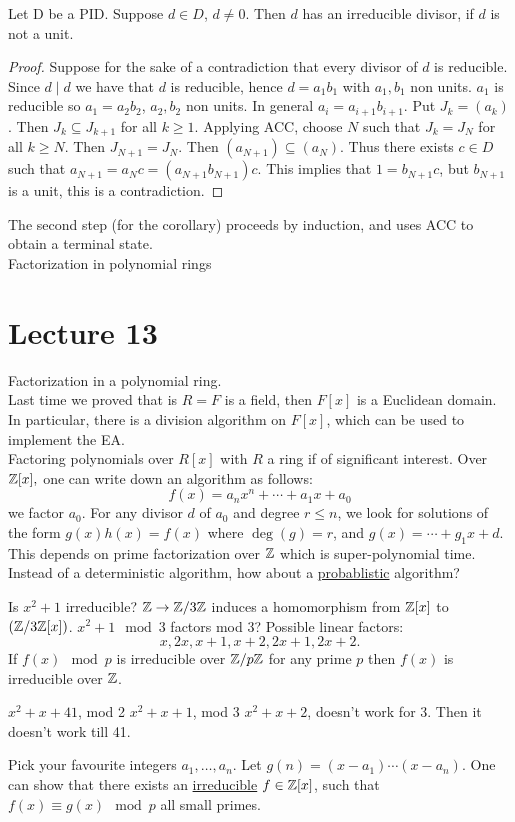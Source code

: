 \documentclass[twoside, openright, fontsize=10pt, headings=big]{scrbook}
\begin{document}
\begin{lemma}{}{}
    Let D be a PID. Suppose $d\in D$, $d\neq0$. Then $d$ has an irreducible divisor, if $d$ is not a unit.
\end{lemma}
\begin{proof}
    Suppose for the sake of a contradiction that every divisor of $d$ is reducible. Since $d\mid d$ we have that $d$ is reducible, hence $d=a_1b_1$ with $a_1,b_1$ non units. $a_1$ is reducible so $a_1=a_2b_2$, $a_2,b_2$ non units. In general $a_i=a_{i+1}b_{i+1}$. Put $J_k=(a_k)$. Then $J_k\subseteq J_{k+1}$ for all $k\geq 1$. Applying ACC, choose $N$ such that $J_k=J_N$ for all $k\geq N$. Then $J_{N+1}=J_N$. Then $(a_{N+1})\subseteq (a_N)$. Thus there exists $c\in D$ such that  $a_{N+1}=a_Nc=(a_{N+1}b_{N+1})c$. This implies that $1=b_{N+1}c$, but $b_{N+1}$ is a unit, this is a contradiction.
\end{proof}
The second step (for the corollary) proceeds by induction, and uses ACC to obtain a terminal state.\\
Factorization in polynomial rings

\chapter{Lecture 13}
Factorization in a polynomial ring.\\
Last time we proved that is $R=F$ is a field, then $F[x]$ is a Euclidean domain. In particular, there is a division algorithm on $F[x]$, which can be used to implement the EA. \\
Factoring polynomials over $R[x]$ with $R$ a ring if of significant interest. Over $\mathbb{Z}[x],$ one can write down an algorithm as follows:
\[
    f(x)=a_nx^n+\cdots+a_1x+a_0
\]
we factor $a_0$. For any divisor $d$ of $a_0$ and degree $r\leq n$, we look for solutions of the form $g(x)h(x)=f(x)$ where $\deg(g)=r$, and $g(x)=\cdots+g_1x+d$. This depends on prime factorization over $\mathbb{Z}$ which is super-polynomial time. Instead of a deterministic algorithm, how about a \underline{probablistic} algorithm? 
\begin{example}{}{}
    Is $x^2+1$ irreducible? $\mathbb{Z}\to\mathbb{Z}/3\mathbb{Z}$ induces a homomorphism from $\mathbb{Z}[x]$ to $(\mathbb{Z}/3\mathbb{Z}[x])$. $x^2+1\mod 3$ factors mod 3? Possible linear factors:
    \[
        x,2x,x+1,x+2,2x+1,2x+2.
    \]
    If $f(x)\mod p$ is irreducible over $\mathbb{Z}/p\mathbb{Z}$ for any prime $p$ then $f(x)$ is irreducible over $\mathbb{Z}$.
\end{example}
\begin{example}{}{}
    $x^2+x+41$, mod 2 $x^2+x+1$, mod 3 $x^2+x+2$, doesn't work for 3. Then it doesn't work till 41.     
\end{example}
Pick your favourite integers $a_1,\dots,a_n$. Let $g(n)=(x-a_1)\cdots(x-a_n)$. One can show that there exists an \underline{irreducible} $f\in\mathbb{Z}[x]$, such that $f(x)\equiv g(x)\mod p$ all small primes.\\
\end{document}
